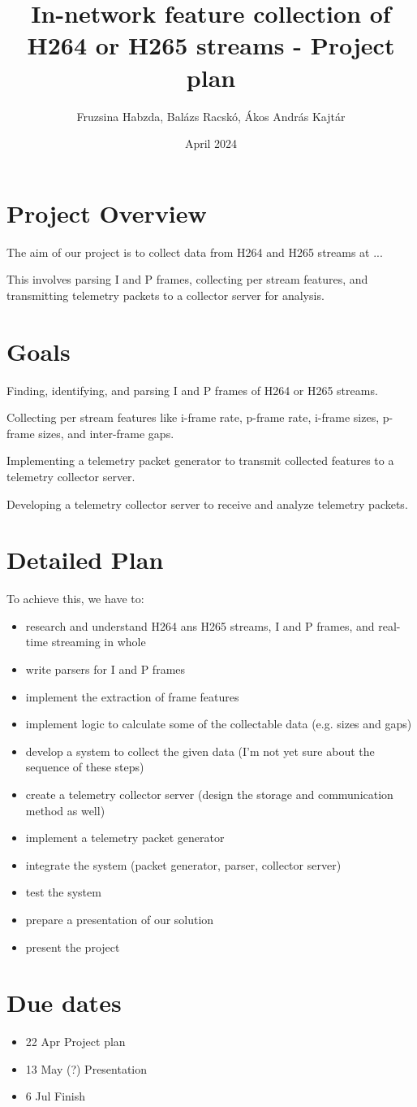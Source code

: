 \documentclass{article}
\title{In-network feature collection of H264 or H265 streams - Project plan}
\author{Fruzsina Habzda, Balázs Racskó, Ákos András Kajtár}
\date{April 2024}
\begin{document}
\maketitle

\section{Project Overview}

The aim of our project is to collect data from H264 and H265 streams at ...

This involves parsing I and P frames, collecting per stream features, and transmitting telemetry packets to a collector server for analysis.

\section{Goals}

Finding, identifying, and parsing I and P frames of H264 or H265 streams.

Collecting per stream features like i-frame rate, p-frame rate, i-frame sizes, p-frame sizes, and inter-frame gaps.

Implementing a telemetry packet generator to transmit collected features to a telemetry collector server.

Developing a telemetry collector server to receive and analyze telemetry packets.

\section{Detailed Plan}

To achieve this, we have to:

\begin{itemize}
\item research and understand H264 ans H265 streams, I and P frames, and real-time streaming in whole
\item write parsers for I and P frames
\item implement the extraction of frame features
\item implement logic to calculate some of the collectable data (e.g. sizes and gaps)
\item develop a system to collect the given data (I'm not yet sure about the sequence of these steps)
\item create  a telemetry collector server (design the storage and communication method as well)
\item implement a telemetry packet generator
\item integrate the system (packet generator, parser, collector server)
\item test the system
\item prepare a presentation of our solution
\item present the project
\end{itemize}


\section{Due dates}

\begin{itemize}
\item 22 Apr Project plan
\item 13 May (?) Presentation
\item 6 Jul Finish
\end{itemize}
\end{document}
